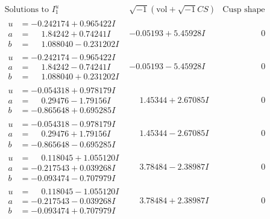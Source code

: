 \documentclass[1p]{elsarticle_modified}
\theoremstyle{definition}
\newcommand{\I}{\sqrt{-1}}
\begin{document}
$$\begin{array}{c|c|c}  
\text{Solutions to }I^u_{1}& \I (\text{vol} + \sqrt{-1}CS) & \text{Cusp shape}\\
 \hline 
\begin{aligned}
u &= -0.242174 + 0.965422 I \\
a &= \phantom{-}1.84242 + 0.74241 I \\
b &= \phantom{-}1.088040 - 0.231202 I\end{aligned}
 & -0.05193 + 5.45928 I & \phantom{-0.000000 } 0 \\ \hline\begin{aligned}
u &= -0.242174 - 0.965422 I \\
a &= \phantom{-}1.84242 - 0.74241 I \\
b &= \phantom{-}1.088040 + 0.231202 I\end{aligned}
 & -0.05193 - 5.45928 I & \phantom{-0.000000 } 0 \\ \hline\begin{aligned}
u &= -0.054318 + 0.978179 I \\
a &= \phantom{-}0.29476 - 1.79156 I \\
b &= -0.865648 + 0.695285 I\end{aligned}
 & \phantom{-}1.45344 + 2.67085 I & \phantom{-0.000000 } 0 \\ \hline\begin{aligned}
u &= -0.054318 - 0.978179 I \\
a &= \phantom{-}0.29476 + 1.79156 I \\
b &= -0.865648 - 0.695285 I\end{aligned}
 & \phantom{-}1.45344 - 2.67085 I & \phantom{-0.000000 } 0 \\ \hline\begin{aligned}
u &= \phantom{-}0.118045 + 1.055120 I \\
a &= -0.217543 + 0.039268 I \\
b &= -0.093474 - 0.707979 I\end{aligned}
 & \phantom{-}3.78484 - 2.38987 I & \phantom{-0.000000 } 0 \\ \hline\begin{aligned}
u &= \phantom{-}0.118045 - 1.055120 I \\
a &= -0.217543 - 0.039268 I \\
b &= -0.093474 + 0.707979 I\end{aligned}
 & \phantom{-}3.78484 + 2.38987 I & \phantom{-0.000000 } 0 \\ \hline\begin{aligned}

\end{aligned}
\end{array}$$
\end{document}
